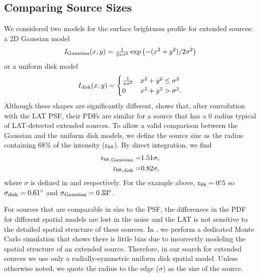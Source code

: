 \subsection{Comparing Source Sizes}


We considered two models for the
surface brightness profile for extended sources: a 2D Gaussian model
\begin{equation}\eqnlabel{gauss_pdf}
  I_\text{Gaussian}(x,y)=\tfrac{1}{2\pi\sigma^2}\exp\left(-(x^2+y^2)/2\sigma^2\right)
\end{equation}
or a uniform disk model
\begin{equation}\eqnlabel{disk_pdf}
  I_\text{disk}(x,y)=
  \begin{cases}
    \frac{1}{\pi\sigma^2} & x^2+y^2\le\sigma^2 \\
    0                      & x^2+y^2>\sigma^2.
  \end{cases}
\end{equation}
Although these shapes are significantly different,
 shows that, after convolution with the
LAT PSF, their PDFs are similar for a source that has a 0 radius
typical of LAT-detected extended sources.  To allow a valid comparison
between the Gaussian and the uniform disk models,
we define the source size as the radius containing 68\% of the
intensity (${\mathrm{r}_{68}}$). 
By direct integration, we find
\begin{align}
{\ensuremath{\mathrm{r}_{68}}}_\text{,Gaussian}=&1.51\sigma, \\
{\mathrm{r}_{68}}_\text{,disk}=&0.82\sigma, 
\end{align}
where $\sigma$ is defined
in  and  respectively.
For the example above, ${\mathrm{r}_{68}}=0\mbox{$.\!\!^\circ$}5$ so $\sigma_\text{disk}=0.61^\circ$
and $\sigma_\text{Gaussian}=0.33^\circ$.

For sources that are comparable in size to the PSF,
the differences in the PDF for
different spatial models are lost in the noise and the LAT is not sensitive
to the detailed spatial structure of these sources.  
In , we perform a dedicated Monte Carlo simulation
that shows there is little bias due to incorrectly modeling the spatial structure
of an extended source.
Therefore, in our search for extended sources we use only a radially-symmetric uniform
disk spatial model. Unless otherwise noted,
we quote the radius to the edge ($\sigma$) as the size of the source.

